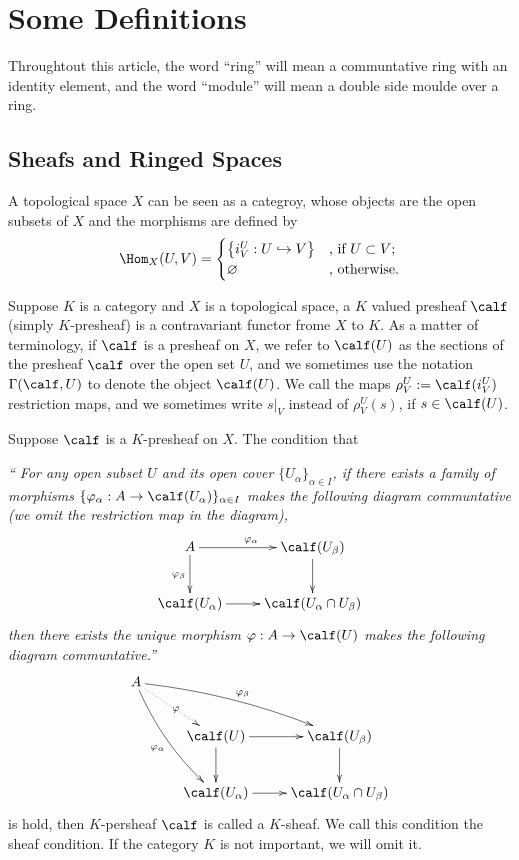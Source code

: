 \renewcommand\chapterimg{Pictures/7.png}
\chapter{Some Definitions}

Throughtout this article, the word ``ring'' will mean a communtative ring with an identity element, and the word ``module'' will mean a double side moulde over a ring.

\section{Sheafs and Ringed Spaces}

\para A topological space $X$ can be seen as a categroy, whose objects are the open subsets of $X$ and the morphisms are defined by
\[
	\Hom_{X}(U,V)=\begin{cases}
	\bigl\{i^U_V:U\hookrightarrow V\bigr\}&\text{, if }U\subset V\text{;}\\
	\varnothing&\text{, otherwise}.
	\end{cases}
\]

\para Suppose $K$ is a category and $X$ is a topological space, a $K$ valued presheaf $\calf$ (simply $K$-presheaf) is a contravariant functor frome $X$ to $K$. As a matter of terminology, if $\calf$ is a presheaf on $X$, we refer to $\calf(U)$ as the sections of the presheaf $\calf$ over the open set $U$, and we sometimes use the notation $\Gamma(\calf,U)$ to denote the object $\calf(U)$. We call the maps $\rho^U_V:=\calf(i^U_V)$ restriction maps, and we sometimes write $s|_V$ instead of $\rho^U_V(s)$, if $s\in \calf(U)$.

\para Suppose $\calf$ is a $K$-presheaf on $X$. The condition that

\textit {`` For any open subset $U$ and its open cover $\{U_\alpha\}_{\alpha\in I}$, if there exists a family of morphisms $\{\varphi_\alpha:A\to \calf(U_\alpha)\}_{\alpha\in I}$ makes the following diagram communtative (we omit the restriction map in the diagram),
\[
	\xymatrix{
		A\ar[r]^{\varphi_{\alpha}}\ar[d]_{\varphi_{\beta}}&\calf(U_\beta)\ar[d]\\
		\calf(U_\alpha)\ar[r]&\calf(U_{\alpha}\cap U_{\beta})
	}
\]
then there exists the unique morphism $\varphi:A\to \calf(U)$ makes the following diagram communtative.''}
\[
	\xymatrix{
		A\ar@/_/[ddr]_{\varphi_{\alpha}}\ar@/^/[drr]^{\varphi_{\beta}}\ar@{.>}[dr]|{\varphi}&& \\
		&\calf(U)\ar[r]\ar[d]&\calf(U_\beta)\ar[d]\\
		&\calf(U_\alpha)\ar[r]&\calf(U_{\alpha}\cap U_{\beta})
	}
\]
is hold, then $K$-persheaf $\calf$ is called a $K$-sheaf. We call this condition the sheaf condition. If the category $K$ is not important, we will omit it.

